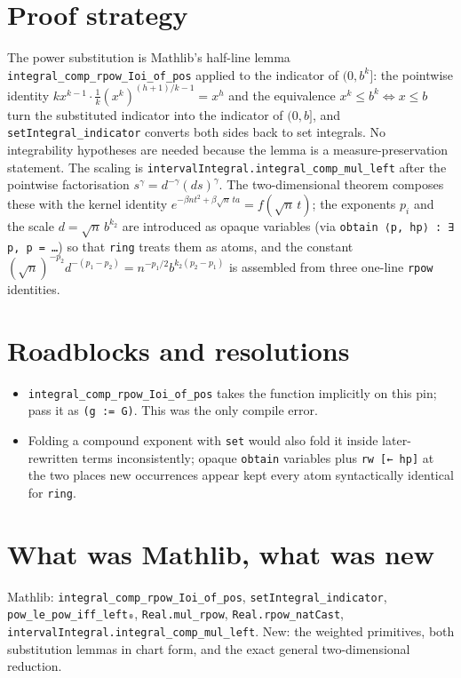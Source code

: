 \documentclass[11pt]{article}
\begin{document}
\section{Proof strategy}
The power substitution is Mathlib's half-line lemma \texttt{integral\_comp\_rpow\_Ioi\_of\_pos}
applied to the indicator of $(0,b^k]$: the pointwise identity
$kx^{k-1}\cdot\tfrac1k(x^k)^{(h+1)/k-1}=x^h$ and the equivalence $x^k\le b^k\iff x\le b$ turn the
substituted indicator into the indicator of $(0,b]$, and \texttt{setIntegral\_indicator} converts
both sides back to set integrals. No integrability hypotheses are needed because the lemma is a
measure-preservation statement. The scaling is \texttt{intervalIntegral.integral\_comp\_mul\_left}
after the pointwise factorisation $s^\gamma=d^{-\gamma}(ds)^\gamma$. The two-dimensional theorem
composes these with the kernel identity $e^{-\beta nt^2+\beta\sqrt n\,ta}=f(\sqrt n\,t)$; the
exponents $p_i$ and the scale $d=\sqrt n\,b^{k_2}$ are introduced as opaque variables (via
\texttt{obtain ⟨p, hp⟩ : ∃ p, p = …}) so that \texttt{ring} treats them as atoms, and the constant
$(\sqrt n)^{-p_2}d^{-(p_1-p_2)}=n^{-p_1/2}b^{k_2(p_2-p_1)}$ is assembled from three one-line
\texttt{rpow} identities.

\section{Roadblocks and resolutions}
\begin{itemize}
\item \texttt{integral\_comp\_rpow\_Ioi\_of\_pos} takes the function implicitly on this pin; pass
it as \texttt{(g := G)}. This was the only compile error.
\item Folding a compound exponent with \texttt{set} would also fold it inside later-rewritten
terms inconsistently; opaque \texttt{obtain} variables plus \texttt{rw [← hp]} at the two places new
occurrences appear kept every atom syntactically identical for \texttt{ring}.
\end{itemize}

\section{What was Mathlib, what was new}
Mathlib: \texttt{integral\_comp\_rpow\_Ioi\_of\_pos}, \texttt{setIntegral\_indicator},
\texttt{pow\_le\_pow\_iff\_left₀}, \texttt{Real.mul\_rpow}, \texttt{Real.rpow\_natCast},
\texttt{intervalIntegral.integral\_comp\_mul\_left}. New: the weighted primitives, both substitution
lemmas in chart form, and the exact general two-dimensional reduction.
\end{document}
